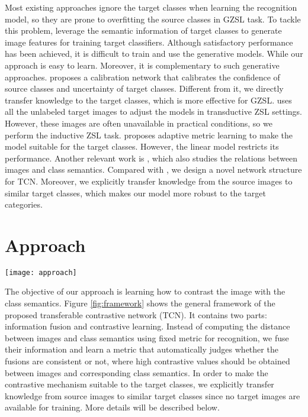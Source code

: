 \documentclass[10pt,twocolumn,letterpaper]{article}
\begin{document}
Most existing approaches ignore the target classes when learning the recognition model, so they are prone to overfitting the source classes in GZSL task. To tackle this problem, \cite{xian2018feature,Zhu2018AGA} leverage the semantic information of target classes to generate image features for training target classifiers. Although satisfactory performance has been achieved, it is difficult to train and use the generative models. While our approach is easy to learn. Moreover, it is complementary to such generative approaches. \cite{Liu2018GeneralizedZL} proposes a calibration network that calibrates the confidence of source classes and uncertainty of target classes. Different from it, we directly transfer knowledge to the target classes, which is more effective for GZSL. \cite{Fu2015TransductiveMZ} uses all the unlabeled target images to adjust the models in transductive ZSL settings. However, these images are often unavailable in practical conditions, so we perform the inductive ZSL task. \cite{Jiang2019AML} proposes adaptive metric learning to make the model suitable for the target classes. However, the linear model restricts its performance. Another relevant work is \cite{sung2018learning}, which also studies the relations between images and class semantics. Compared with \cite{sung2018learning}, we design a novel network structure for TCN. Moreover, we explicitly transfer knowledge from the source images to similar target classes, which makes our model more robust to the target categories.

\section{Approach}

\begin{figure*}[t]
\centering
\texttt{[image: approach]}
\caption{The framework of transferable contrastive network. The information fusion module merges the image information with the class semantic information. The contrastive learning module automatically judges whether the fusion is consistent or not. `$\bigotimes$' denotes the element-wise product operation.}
\label{fig:framework}
\end{figure*}

The objective of our approach is learning how to contrast the image with the class semantics. Figure \ref{fig:framework} shows the general framework of the proposed transferable contrastive network (TCN). It contains two parts: information fusion and contrastive learning. Instead of computing the distance between images and class semantics using fixed metric for recognition, we fuse their information and learn a metric that automatically judges whether the fusions are consistent or not, where high contrastive values should be obtained between images and corresponding class semantics. In order to make the contrastive mechanism suitable to the target classes, we explicitly transfer knowledge from source images to similar target classes since no target images are available for training. More details will be described below.
\end{document}
